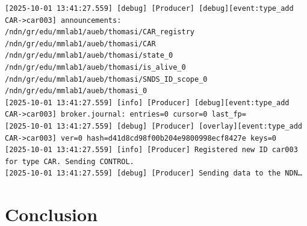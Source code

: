 \documentclass{article}
\begin{document}
\begin{lstlisting}[language=log, caption={SeEDS Service logs after publishing through the \emph{MMLab2} node to \textit{@type=CAR} registry}, label={lst:producer-seeds-service-logs-after-publish-through-mmlab2}]
[2025-10-01 13:41:27.559] [debug] [Producer] [debug][event:type_add CAR->car003] announcements: /ndn/gr/edu/mmlab1/aueb/thomasi/CAR_registry /ndn/gr/edu/mmlab1/aueb/thomasi/CAR /ndn/gr/edu/mmlab1/aueb/thomasi/state_0 /ndn/gr/edu/mmlab1/aueb/thomasi/is_alive_0 /ndn/gr/edu/mmlab1/aueb/thomasi/SNDS_ID_scope_0 /ndn/gr/edu/mmlab1/aueb/thomasi_0 
[2025-10-01 13:41:27.559] [info] [Producer] [debug][event:type_add CAR->car003] broker.journal: entries=0 cursor=0 last_fp=
[2025-10-01 13:41:27.559] [debug] [Producer] [overlay][event:type_add CAR->car003] ver=0 hash=d41d8cd98f00b204e9800998ecf8427e keys=0
[2025-10-01 13:41:27.559] [info] [Producer] Registered new ID car003 for type CAR. Sending CONTROL.
[2025-10-01 13:41:27.559] [debug] [Producer] Sending data to the NDN…
\end{lstlisting}

\section{Conclusion}
\end{document}
